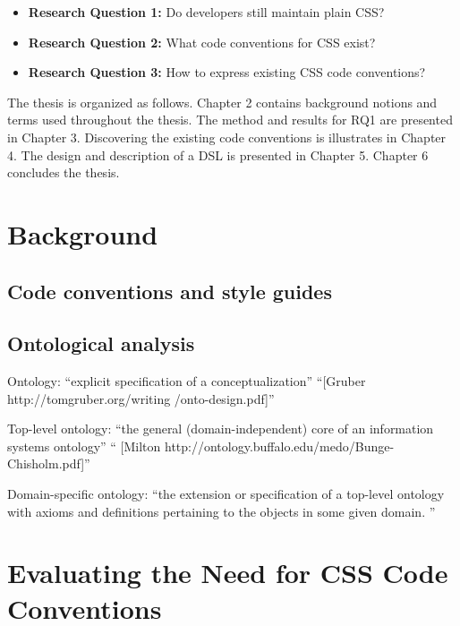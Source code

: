 \documentclass[parskip=full]{uvamscse}
\begin{document}
  \begin{itemize}
    \item \textbf{Research Question 1:} Do developers still maintain plain CSS?
    \item \textbf{Research Question 2:} What code conventions for CSS exist?
    \item \textbf{Research Question 3:} How to express existing CSS code conventions?
  \end{itemize}

The thesis is organized as follows. Chapter 2 contains background notions and terms used throughout
the thesis. The method and results for RQ1 are presented in Chapter 3. Discovering the existing code
conventions is illustrates in Chapter 4. The design and description of a DSL is presented in Chapter
5. Chapter 6 concludes the thesis.



\chapter{Background}

\section{Code conventions and style guides}

\section{Ontological analysis}

Ontology: ``explicit specification of a conceptualization'' ``[Gruber http://tomgruber.org/writing
/onto-design.pdf]''

Top-level ontology: ``the general (domain-independent) core of an information systems ontology''
``
[Milton http://ontology.buffalo.edu/medo/Bunge-Chisholm.pdf]''

Domain-specific ontology: ``the extension or specification of a top-level ontology with axioms and
definitions pertaining to the objects in some given domain. ''

\chapter{Evaluating the Need for CSS Code Conventions}
\end{document}
